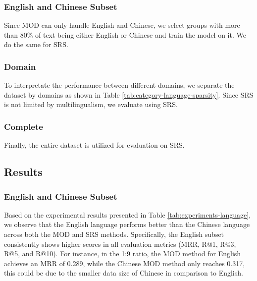 \subsubsection{English and Chinese Subset}
Since MOD can only handle English and Chinese, we select groups with more than 80\% of text being either English or Chinese and train the model on it. We do the same for SRS.

\subsubsection{Domain}
To interpretate the performance between different domains, we separate the dataset by domains as shown in Table \ref{tab:category-language-sparsity}. Since SRS is not limited by multilingualism, we evaluate using SRS.

\subsubsection{Complete}
Finally, the entire dataset is utilized for evaluation on SRS.

\subsection{Results}
\subsubsection{English and Chinese Subset}
Based on the experimental results presented in Table \ref{tab:experiments-language}, we observe that the English language performs better than the Chinese language across both the MOD and SRS methods. Specifically, the English subset consistently shows higher scores in all evaluation metrics (MRR, R@1, R@3, R@5, and R@10). For instance, in the 1:9 ratio, the MOD method for English achieves an MRR of 0.289, while the Chinese MOD method only reaches 0.317, this could be due to the smaller data size of Chinese in comparison to English.


